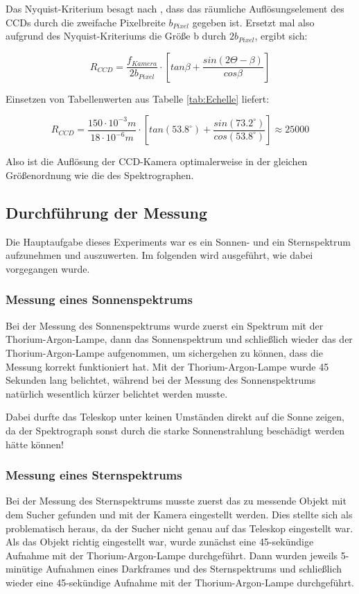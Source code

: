 Das Nyquist-Kriterium besagt nach \cite{ronomischesPraktikum}, dass das räumliche Auflösungselement des CCDs durch die zweifache Pixelbreite $ b_{Pixel} $ gegeben ist. Ersetzt mal also aufgrund des Nyquist-Kriteriums die Größe b durch $ 2b_{Pixel} $, ergibt sich:

\begin{equation}
R_{CCD} = \frac{f_{Kamera}}{2b_{Pixel}}\cdot \left[tan \beta + \frac{sin(2\Theta-\beta)}{cos \beta}\right]
\end{equation}

Einsetzen von Tabellenwerten aus Tabelle \ref{tab:Echelle} liefert:
 
\begin{equation}
R_{CCD} = \frac{150\cdot10^{-3}m}{18\cdot10^{-6}m}\cdot \left[tan (53.8^{\circ}) + \frac{sin(73.2^{\circ})}{cos (53.8^{\circ})}\right] \approx 25000
\end{equation}

Also ist die Auflösung der CCD-Kamera optimalerweise in der gleichen Größenordnung wie die des Spektrographen.
			
\subsection{Durchführung der Messung}
Die Hauptaufgabe dieses Experiments war es ein Sonnen- und ein Sternspektrum aufzunehmen und auszuwerten. Im folgenden wird ausgeführt, wie dabei vorgegangen wurde.

\subsubsection{Messung eines Sonnenspektrums}
Bei der Messung des Sonnenspektrums wurde zuerst ein Spektrum mit der Thorium-Argon-Lampe, dann das Sonnenspektrum und schließlich wieder das der Thorium-Argon-Lampe aufgenommen, um sichergehen zu können, dass die Messung korrekt funktioniert hat. Mit der Thorium-Argon-Lampe wurde 45 Sekunden lang belichtet, während bei der Messung des Sonnenspektrums natürlich wesentlich kürzer belichtet werden musste.

Dabei durfte das Teleskop unter keinen Umständen direkt auf die Sonne zeigen, da der Spektrograph sonst durch die starke Sonnenstrahlung beschädigt werden hätte können!

\subsubsection{Messung eines Sternspektrums}
Bei der Messung des Sternspektrums musste zuerst das zu messende Objekt mit dem Sucher gefunden und mit der Kamera eingestellt werden. Dies stellte sich als problematisch heraus, da der Sucher nicht genau auf das Teleskop eingestellt war. Als das Objekt richtig eingestellt war, wurde zunächst eine 45-sekündige Aufnahme mit der Thorium-Argon-Lampe durchgeführt. Dann wurden jeweils 5-minütige Aufnahmen eines Darkframes und des Sternspektrums und schließlich wieder eine 45-sekündige Aufnahme mit der Thorium-Argon-Lampe durchgeführt.

